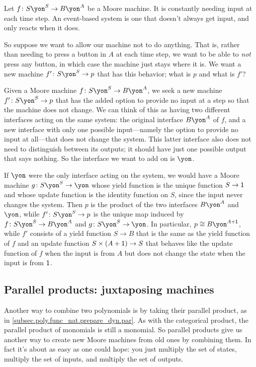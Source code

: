 \documentclass[Book-Poly]{subfiles}
\begin{document}
\begin{exercise}
Let $f\colon S\yon^S\to B\yon^A$ be a Moore machine. It is constantly needing input at each time step. An event-based system is one that doesn't always get input, and only reacts when it does.

So suppose we want to allow our machine not to do anything. That is, rather than needing to press a button in $A$ at each time step, we want to be able to \emph{not} press any button, in which case the machine just stays where it is. We want a new machine $f'\colon S\yon^S\to p$ that has this behavior; what is $p$ and what is $f'$?
\begin{solution}
Given a Moore machine $f\colon S\yon^S\to B\yon^A$, we seek a new machine $f'\colon S\yon^S\to p$ that has the added option to provide no input at a step so that the machine does not change.
We can think of this as having two different interfaces acting on the same system: the original interface $B\yon^A$ of $f$, and a new interface with only one possible input---namely the option to provide no input at all---that does not change the system.
This latter interface also does not need to distinguish between its outputs; it should have just one possible output that says nothing.
So the interface we want to add on is $\yon$.

If $\yon$ were the only interface acting on the system, we would have a Moore machine $g \colon S\yon^S \to \yon$ whose yield function is the unique function $S \to \textsf{1}$ and whose update function is the identity function on $S$, since the input never changes the system.
Then $p$ is the product of the two interfaces $B\yon^A$ and $\yon$, while $f' \colon S\yon^S \to p$ is the unique map induced by $f \colon S\yon^S \to B\yon^A$ and $g \colon S\yon^S \to \yon$.
In particular, $p \iso B\yon^{A + \1}$, while $f'$ consists of a yield function $S \to B$ that is the same as the yield function of $f$ and an update function $S \times (A + \textsf{1}) \to S$ that behaves like the update function of $f$ when the input is from $A$ but does not change the state when the input is from $\textsf{1}$.
\end{solution}
\end{exercise}

\subsection{Parallel products: juxtaposing machines}

Another way to combine two polynomials is by taking their parallel product, as in \cref{subsec.poly.func_nat.prepare_dyn.par}.
As with the categorical product, the parallel product of monomials is still a monomial.
So parallel products give us another way to create new Moore machines from old ones by combining them. In fact it's about as easy as one could hope: you just multiply the set of states, multiply the set of inputs, and multiply the set of outputs.
\end{document}
